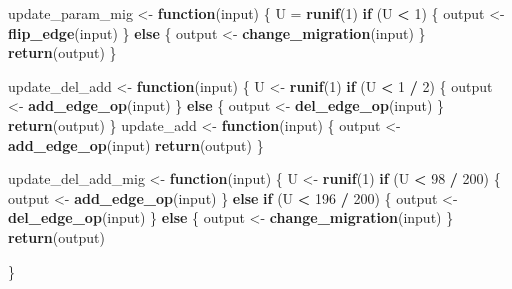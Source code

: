 \documentclass[11pt,a4paper]{article}
\newenvironment{Shaded}{\begin{snugshade}}{\end{snugshade}}
\newcommand{\ControlFlowTok}[1]{\textcolor[rgb]{0.13,0.29,0.53}{\textbf{#1}}}
\newcommand{\DecValTok}[1]{\textcolor[rgb]{0.00,0.00,0.81}{#1}}
\newcommand{\KeywordTok}[1]{\textcolor[rgb]{0.13,0.29,0.53}{\textbf{#1}}}
\newcommand{\NormalTok}[1]{#1}
\newcommand{\OperatorTok}[1]{\textcolor[rgb]{0.81,0.36,0.00}{\textbf{#1}}}
\newcommand{\StringTok}[1]{\textcolor[rgb]{0.31,0.60,0.02}{#1}}
\begin{document}
\begin{Shaded}
\begin{Highlighting}[]
\NormalTok{update_param_mig <-}\StringTok{ }\ControlFlowTok{function}\NormalTok{(input) \{}
\NormalTok{  U =}\StringTok{ }\KeywordTok{runif}\NormalTok{(}\DecValTok{1}\NormalTok{)}
  \ControlFlowTok{if}\NormalTok{ (U }\OperatorTok{<}\StringTok{ }\DecValTok{1}\NormalTok{) \{}
\NormalTok{    output <-}\StringTok{ }\KeywordTok{flip_edge}\NormalTok{(input)}
\NormalTok{  \} }\ControlFlowTok{else}\NormalTok{ \{}
\NormalTok{    output <-}\StringTok{ }\KeywordTok{change_migration}\NormalTok{(input)}
\NormalTok{  \}}
  \KeywordTok{return}\NormalTok{(output)}
\NormalTok{\}}
\end{Highlighting}
\end{Shaded}

\begin{Shaded}
\begin{Highlighting}[]
\NormalTok{update_del_add <-}\StringTok{ }\ControlFlowTok{function}\NormalTok{(input) \{}
\NormalTok{  U <-}\StringTok{ }\KeywordTok{runif}\NormalTok{(}\DecValTok{1}\NormalTok{)}
  \ControlFlowTok{if}\NormalTok{ (U }\OperatorTok{<}\StringTok{ }\DecValTok{1} \OperatorTok{/}\StringTok{ }\DecValTok{2}\NormalTok{) \{}
\NormalTok{    output <-}\StringTok{ }\KeywordTok{add_edge_op}\NormalTok{(input)}
\NormalTok{  \} }\ControlFlowTok{else}\NormalTok{ \{}
\NormalTok{    output <-}\StringTok{ }\KeywordTok{del_edge_op}\NormalTok{(input)}
\NormalTok{  \}}
  \KeywordTok{return}\NormalTok{(output)}
\NormalTok{\}}
\NormalTok{update_add <-}\StringTok{ }\ControlFlowTok{function}\NormalTok{(input) \{}
\NormalTok{  output <-}\StringTok{ }\KeywordTok{add_edge_op}\NormalTok{(input)}
  \KeywordTok{return}\NormalTok{(output)}
\NormalTok{\}}

\NormalTok{update_del_add_mig <-}\StringTok{ }\ControlFlowTok{function}\NormalTok{(input) \{}
\NormalTok{  U <-}\StringTok{ }\KeywordTok{runif}\NormalTok{(}\DecValTok{1}\NormalTok{)}
  \ControlFlowTok{if}\NormalTok{ (U }\OperatorTok{<}\StringTok{ }\DecValTok{98} \OperatorTok{/}\StringTok{ }\DecValTok{200}\NormalTok{) \{}
\NormalTok{    output <-}\StringTok{ }\KeywordTok{add_edge_op}\NormalTok{(input)}
\NormalTok{  \} }\ControlFlowTok{else} \ControlFlowTok{if}\NormalTok{ (U }\OperatorTok{<}\StringTok{ }\DecValTok{196} \OperatorTok{/}\StringTok{ }\DecValTok{200}\NormalTok{) \{}
\NormalTok{    output <-}\StringTok{ }\KeywordTok{del_edge_op}\NormalTok{(input)}
\NormalTok{  \} }\ControlFlowTok{else}\NormalTok{ \{}
\NormalTok{    output <-}\StringTok{ }\KeywordTok{change_migration}\NormalTok{(input)}
\NormalTok{  \}}
  \KeywordTok{return}\NormalTok{(output)}
  
\NormalTok{\}}
\end{Highlighting}
\end{Shaded}
\end{document}
